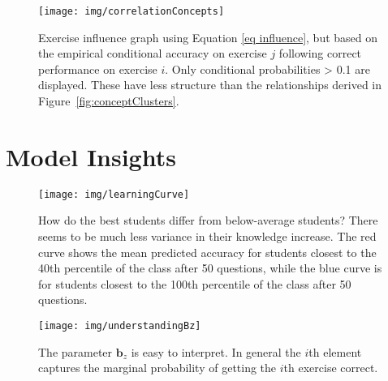 \documentclass{article} \usepackage{nips,times}
\newcommand{\mb}{\mathbf}
\begin{document}
\begin{figure}[h]
\centering
\texttt{[image: img/correlationConcepts]}
\caption{Exercise influence graph using Equation \ref{eq influence}, but based on the empirical conditional accuracy on exercise $j$ following correct performance on exercise $i$. Only conditional probabilities > 0.1 are displayed.
These have less structure than the relationships derived in Figure~\ref{fig:conceptClusters}.
\label{fig:correlationConcepts}
}
\end{figure}

\section{Model Insights}

\begin{figure}[h]
\centering
\texttt{[image: img/learningCurve]}
\caption{How do the best students differ from below-average students? There seems to be much less variance in their knowledge increase. The red curve shows the mean predicted accuracy for students closest to the 40th percentile of the class after 50 questions, while the blue curve is for students closest to the 100th percentile of the class after 50 questions.
\label{fig:learningCurve}
}
\end{figure}

\begin{figure}[h]
\centering
\texttt{[image: img/understandingBz]}
\caption{The parameter $\mb b_{z}$ is easy to interpret. In general the $i$th element captures the marginal probability of getting the $i$th exercise correct.
\label{fig:understandingB}
}
\end{figure}
\end{document}
